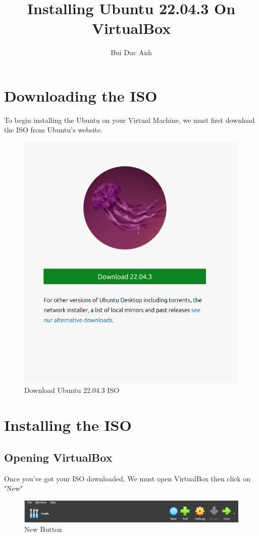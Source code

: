 \documentclass{article}
\author{Bui Duc Anh}
\title{Installing Ubuntu 22.04.3 On VirtualBox}
\begin{document}
    \maketitle{}
    \newpage
    \section*{Downloading the ISO}
    To begin installing the Ubuntu on your Virtual Machine, we must first download the ISO from Ubuntu's website.
        \begin{figure}[H]
            \centering
            \includegraphics{Pics/Download_Page.png}
            \caption{Download Ubuntu 22.04.3 ISO}
            \label{fig:Going to the website}
        \end{figure}
    \section*{Installing the ISO}
    \subsection*{Opening VirtualBox}
    Once you've got your ISO downloaded, We must open VirtualBox then click on "New"
    \begin{figure}[H]
            \centering
            \includegraphics{Pics/New_Example.png}
            \caption{New Button}
        \end{figure}
\end{document}
